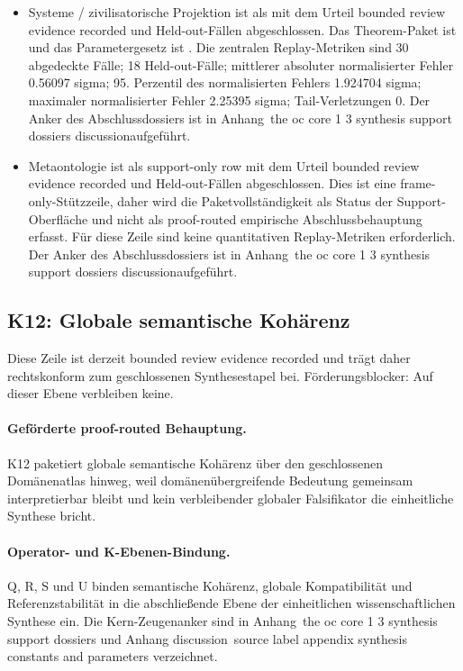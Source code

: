 \begin{itemize}[leftmargin=1.6em,nosep]
\item Systeme / zivilisatorische Projektion ist als  mit dem Urteil bounded review evidence recorded und  Held-out-Fällen abgeschlossen. Das Theorem-Paket ist  und das Parametergesetz ist . Die zentralen Replay-Metriken sind 30 abgedeckte Fälle; 18 Held-out-Fälle; mittlerer absoluter normalisierter Fehler 0.56097 sigma; 95. Perzentil des normalisierten Fehlers 1.924704 sigma; maximaler normalisierter Fehler 2.25395 sigma; Tail-Verletzungen 0. Der Anker des Abschlussdossiers ist in Anhang~the oc core 1 3 synthesis support dossiers discussionaufgeführt.
\item Metaontologie ist als support-only row mit dem Urteil bounded review evidence recorded und  Held-out-Fällen abgeschlossen. Dies ist eine frame-only-Stützzeile, daher wird die Paketvollständigkeit als Status der Support-Oberfläche und nicht als proof-routed empirische Abschlussbehauptung erfasst. Für diese Zeile sind keine quantitativen Replay-Metriken erforderlich. Der Anker des Abschlussdossiers ist in Anhang~the oc core 1 3 synthesis support dossiers discussionaufgeführt.
\end{itemize}

\subsection{K12: Globale semantische Kohärenz}
\label{sec:oc-core-1-3-synthesis-k12}
Diese Zeile ist derzeit bounded review evidence recorded und trägt daher rechtskonform zum geschlossenen Synthesestapel bei.
Förderungsblocker: Auf dieser Ebene verbleiben keine.

\paragraph{Geförderte proof-routed Behauptung.}
K12 paketiert globale semantische Kohärenz über den geschlossenen Domänenatlas hinweg, weil domänenübergreifende Bedeutung gemeinsam interpretierbar bleibt und kein verbleibender globaler Falsifikator die einheitliche Synthese bricht.

\paragraph{Operator- und K-Ebenen-Bindung.}
Q, R, S und U binden semantische Kohärenz, globale Kompatibilität und Referenzstabilität in die abschließende Ebene der einheitlichen wissenschaftlichen Synthese ein.
Die Kern-Zeugenanker sind in Anhang~the oc core 1 3 synthesis support dossiers und Anhang discussion~source label appendix synthesis constants and parameters verzeichnet.

